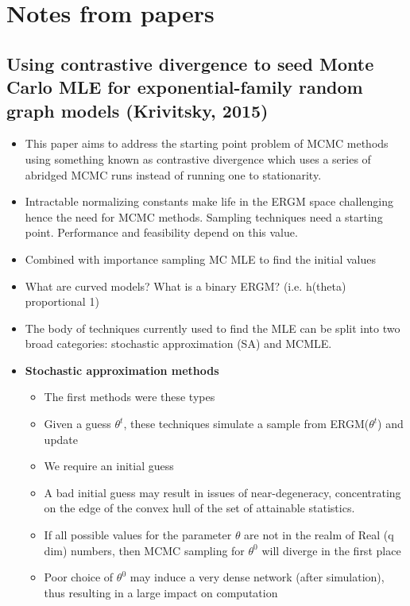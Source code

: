 	
\section{Notes from papers}

\subsection{Using contrastive divergence to seed Monte Carlo MLE for exponential-family
random graph models (Krivitsky, 2015)}

\begin{itemize}

    \item This paper aims to address the starting point problem of MCMC methods using something known as contrastive divergence which uses a series of abridged MCMC runs instead of running one to stationarity.
    \item Intractable normalizing constants make life in the ERGM space challenging hence the need for MCMC methods. Sampling techniques need a starting point. Performance and feasibility depend on this value.
    \item Combined with importance sampling MC MLE to find the initial values
    \item What are curved models? What is a binary ERGM? (i.e. h(theta) proportional 1)
    \item The body of techniques currently used to find the MLE can be split into two broad categories: stochastic approximation (SA) and MCMLE.
    \item \textbf{Stochastic approximation methods}
    \begin{itemize}
        \item The first methods were these types
        \item Given a guess $\theta^{t}$, these techniques simulate a sample from ERGM($\theta^{t}$) and update
        \item We require an initial guess
        \item A bad initial guess may result in issues of near-degeneracy, concentrating on the edge of the convex hull of the set of attainable statistics.
        \item If all possible values for the parameter $\theta$ are not in the realm of Real (q dim) numbers, then MCMC sampling for $\theta^{0}$ will diverge in the first place
        \item Poor choice of $\theta^{0}$ may induce a very dense network (after simulation), thus resulting in a large impact on computation

\end{itemize}
\end{itemize}
